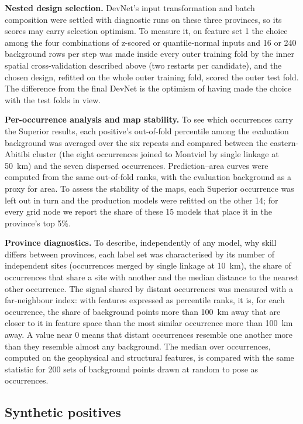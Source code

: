 \documentclass[pdflatex,sn-apa]{sn-jnl}
\begin{document}
\textbf{Nested design selection.} DevNet's input transformation and batch composition were settled with diagnostic runs on these three provinces, so its scores may carry selection optimism. To measure it, on feature set 1 the choice among the four combinations of z-scored or quantile-normal inputs and 16 or 240 background rows per step was made inside every outer training fold by the inner spatial cross-validation described above (two restarts per candidate), and the chosen design, refitted on the whole outer training fold, scored the outer test fold. The difference from the final DevNet is the optimism of having made the choice with the test folds in view.

\textbf{Per-occurrence analysis and map stability.} To see which occurrences carry the Superior results, each positive's out-of-fold percentile among the evaluation background was averaged over the six repeats and compared between the eastern-Abitibi cluster (the eight occurrences joined to Montviel by single linkage at 50~km) and the seven dispersed occurrences. Prediction--area curves \citep{YousefiCarranza2015} were computed from the same out-of-fold ranks, with the evaluation background as a proxy for area. To assess the stability of the maps, each Superior occurrence was left out in turn and the production models were refitted on the other 14; for every grid node we report the share of these 15 models that place it in the province's top 5\%.

\textbf{Province diagnostics.} To describe, independently of any model, why skill differs between provinces, each label set was characterised by its number of independent sites (occurrences merged by single linkage at 10~km), the share of occurrences that share a site with another and the median distance to the nearest other occurrence. The signal shared by distant occurrences was measured with a far-neighbour index: with features expressed as percentile ranks, it is, for each occurrence, the share of background points more than 100~km away that are closer to it in feature space than the most similar occurrence more than 100~km away. A value near 0 means that distant occurrences resemble one another more than they resemble almost any background. The median over occurrences, computed on the geophysical and structural features, is compared with the same statistic for 200 sets of background points drawn at random to pose as occurrences.

\subsection{Synthetic positives}\label{sec:augmentation}
\end{document}

